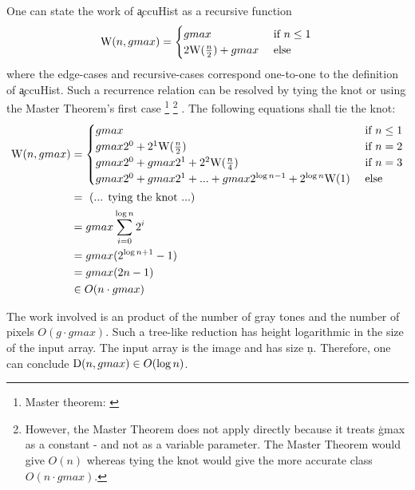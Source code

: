     One can state the work of \c{accuHist} as a recursive function
    \begin{equation*}
    \textrm{W}(n,gmax) = \begin{cases}
                 gmax & \text{ if } n \le 1 \\ 
                 2 \textrm{W}(\frac{n}{2}) + gmax & \text{ else }
                \end{cases} \\
    \end{equation*}
    where the edge-cases and recursive-cases correspond one-to-one
    to the definition of \c{accuHist}.
    Such a recurrence relation can be resolved by tying the knot
    or using the Master Theorem's first case
    \footnote{Master theorem: \cite{Cormen2001}}
    \footnote{However, the Master Theorem does not apply directly
    because it treats \c{gmax} as a constant -
    and not as a variable parameter.
    The Master Theorem would give $O(n)$ whereas tying the knot
    would give the more accurate class $O(n \cdot gmax)$.}
    .
    The following equations shall tie the knot:
    \begin{equation*}
    \begin{split}
    \textrm{W}(n,gmax)
      & = \begin{cases}
            gmax & \text{ if } n \le 1 \\ 
            gmax2^0 + 2^1\textrm{W}(\frac{n}{2}) & \text{ if } n = 2 \\
            gmax2^0 + gmax2^1 + 2^2\textrm{W}(\frac{n}{4}) & \text{ if } n = 3 \\
            gmax2^0 + gmax2^1 + ... + gmax 2^{\log n - 1} + 2^{\log n}\textrm{W}(1) & \text{ else }
          \end{cases} \\
      & = \textrm{ (... tying the knot ...) } \\
      & = gmax \sum_{i=0}^{\log n}{2^i} \\
      & = gmax (2^{\log n + 1} - 1) \\
      & = gmax (2n - 1) \\
      & \in O(n \cdot gmax) \\
    \end{split}
    \end{equation*}
    
    The work involved is an product of the number of gray tones and
    the number of pixels $O(g \cdot gmax)$.
    Such a tree-like reduction has height logarithmic
    in the size of the input array. The input array is the image and
    has size \c{n}. Therefore, one can conclude
    $\textrm{D}(n, gmax) \in O(\log n)$.
  
